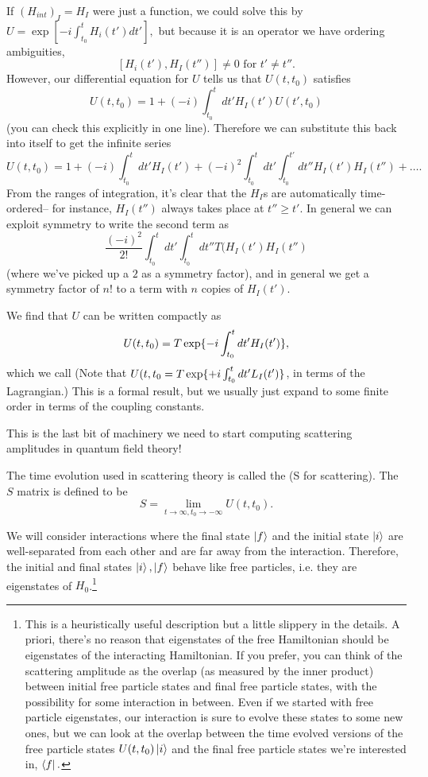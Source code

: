 If $(H_{int})_I=H_I$ were just a function, we could solve this by $U=\exp[-i \int_{t_0}^t H_i(t')dt'],$ but because it is an operator we have ordering ambiguities,
$$[H_i(t'),H_I(t'')]\neq 0 \text{ for }t'\neq t''.$$
However, our differential equation for $U$ tells us that $U(t,t_0)$ satisfies
$$U(t,t_0)=1+(-i)\int_{t_0}^t dt' H_I(t')U(t',t_0)$$
(you can check this explicitly in one line). Therefore we can substitute this back into itself to get the infinite series
$$U(t,t_0)=1+(-i)\int_{t_0}^t dt' H_I(t')+(-i)^2 \int_{t_0}^t dt' \int_{t_0}^{t'} dt'' H_I(t')H_I(t'')+\ldots.$$
From the ranges of integration, it's clear that the $H_I$s are automatically time-ordered-- for instance, $H_I(t'')$ always takes place at $t''\geq t'$. In general we can exploit symmetry to write the second term as
$$\frac{(-i)^2}{2!}\int_{t_0}^t dt' \int_{t_0}^t dt'' T(H_I(t')H_I(t'')$$ (where we've picked up a $2$ as a symmetry factor), and in general we get a symmetry factor of $n!$ to a term with $n$ copies of $H_I(t')$.
\begin{defn}
We find that $U$ can be written compactly as
$$U(t,t_0)=T \exp \{-i\int_{t_0}^t dt' H_I(t')\},$$
which we call  (Note that $U(t,t_0=T \exp \{+i\int_{t_0}^t dt' L_I(t')\}$, in terms of the Lagrangian.) This is a formal result, but we usually just expand to some finite order in terms of the coupling constants.
\end{defn}
This is the last bit of machinery we need to start computing scattering amplitudes in quantum field theory!

\begin{defn}
The time evolution used in scattering theory is called the  (S for scattering). The $S$ matrix is defined to be
$$S=\lim_{t\to \infty,t_0\to -\infty}U(t,t_0).$$
\end{defn}
We will consider interactions where the final state $\left| f \right>$ and the initial state $\left| i \right>$ are well-separated from each other and are far away from the interaction. Therefore, the initial and final states $\left| i \right>,\left| f \right>$ behave like free particles, i.e. they are eigenstates of $H_0$.\footnote{This is a heuristically useful description but a little slippery in the details. A  priori, there's no reason that eigenstates of the free Hamiltonian should be eigenstates of the interacting Hamiltonian. If you prefer, you can think of the scattering amplitude as the overlap (as measured by the inner product) between initial free particle states and final free particle states, with the possibility for some interaction in between. Even if we started with free particle eigenstates, our interaction is sure to evolve these states to some new ones, but we can look at the overlap between the time evolved versions of the free particle states $U(t,t_0)\left| i \right>$ and the final free particle states we're interested in, $\left< f \right|.$}

